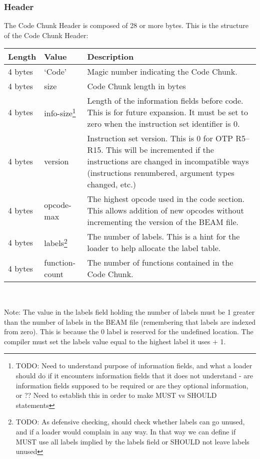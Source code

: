 \documentclass{article}
\begin{document}
\subsubsection{Header}
The Code Chunk Header is composed of 28 or more bytes.
This is the structure of the Code Chunk Header:\\
\begin{savenotes}
\begin{tabular}{ |l|l|p{3in}| } \hline
Length  & Value  & Description\\ \hline
4 bytes & `Code' & Magic number indicating the Code Chunk.\\ \hline
4 bytes & size & Code Chunk length in bytes\\ \hline
4 bytes & info-size\footnote{TODO: Need to understand purpose of information fields, and what a loader should do if it encounters information fields that it does not understand - are information fields supposed to be required or are they optional information, or ??  Need to establish this in order to make MUST vs SHOULD statements}
                     & Length of the information fields before code.  This is for future expansion.  It must be set to zero when the instruction set identifier is 0.\\ \hline
4 bytes & version & Instruction set version.  This is 0 for OTP R5--R15.  This will be incremented if the instructions are changed in incompatible ways (instructions renumbered, argument types changed, etc.)\\ \hline
4 bytes & opcode-max & The highest opcode used in the code section. This allows addition of new opcodes without incrementing the version of the BEAM file.\\ \hline
4 bytes & labels\footnote{TODO: As defensive checking, should check whether labels can go unused, and if a loader would complain in any way.  In that way we can define if MUST use all labels implied by the labels field or SHOULD not leave labels unused}
                  & The number of labels.  This is a hint for the loader to help allocate the label table.\\ \hline
4 bytes & function-count & The number of functions contained in the Code Chunk.\\ \hline
\end{tabular}\\
\end{savenotes}

Note: The value in the labels field holding the number of labels must be 
1 greater than the number of labels in the BEAM file (remembering that 
labels are indexed from zero).  This is because the 0 label is reserved 
for the undefined location.  The compiler must set the labels value equal 
to the highest label it uses + 1.
\end{document}
